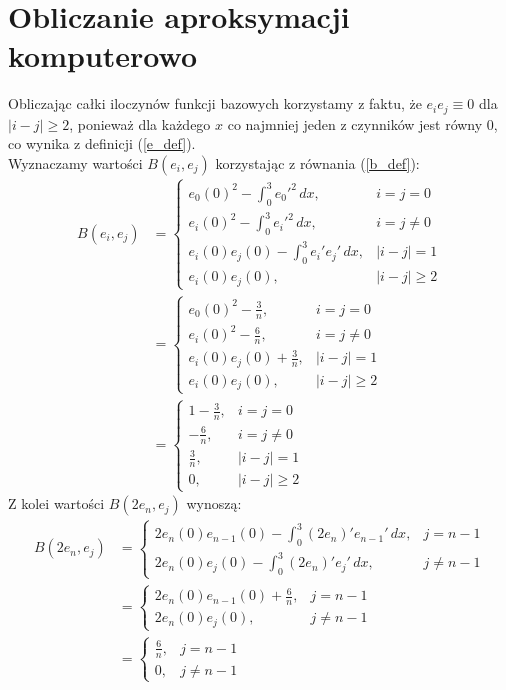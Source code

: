 \documentclass[a4paper,12pt]{article}
\begin{document}
    \section{Obliczanie aproksymacji komputerowo}
    Obliczając całki iloczynów funkcji bazowych korzystamy z faktu, że \(e_i e_j \equiv 0\) dla \(|i-j| \geq 2\), ponieważ dla każdego \(x\) co najmniej jeden z czynników jest równy 0, co wynika z definicji (\ref{e_def}).\\
    Wyznaczamy wartości \(B(e_i, e_j)\) korzystając z równania (\ref{b_def}):
    \begin{align}
        B(e_i, e_j) &=
        \begin{cases}
            e_0(0)^2 - \int_{0}^{3} e_0'^2\,dx,& i = j = 0 \\
            e_i(0)^2 - \int_{0}^{3} e_i'^2\,dx,& i = j \neq 0 \\
            e_i(0)e_j(0) - \int_{0}^{3} e_i' e_j'\,dx,& |i-j| = 1 \\
            e_i(0)e_j(0),& |i-j| \geq 2
        \end{cases} \nonumber \\
        &=
        \begin{cases}
            e_0(0)^2 - \frac{3}{n},& i = j = 0 \\
            e_i(0)^2 - \frac{6}{n},& i = j \neq 0 \\
            e_i(0)e_j(0) + \frac{3}{n},& |i-j| = 1 \\
            e_i(0)e_j(0),& |i-j| \geq 2
        \end{cases} \nonumber \\
        &=
        \begin{cases}
            1-\frac{3}{n},& i = j = 0 \\
            -\frac{6}{n},& i = j \neq 0 \\
            \frac{3}{n},& |i-j| = 1 \\
            0,& |i-j| \geq 2
        \end{cases} \label{bij_val}
    \end{align}
    Z kolei wartości \(B(2e_n, e_j)\) wynoszą:
    \begin{align}
        B(2e_n, e_j) &=
        \begin{cases}
            2e_n(0)e_{n-1}(0) - \int_{0}^{3} (2e_n)' e_{n-1}'\,dx,& j = n-1 \\
            2e_n(0)e_j(0) - \int_{0}^{3} (2e_n)' e_j'\,dx,& j \neq n-1
        \end{cases} \nonumber \\
        &=
        \begin{cases}
            2e_n(0)e_{n-1}(0) + \frac{6}{n},& j = n-1 \\
            2e_n(0)e_j(0),& j \neq n-1
        \end{cases} \nonumber \\
        &=
        \begin{cases}
            \frac{6}{n},& j = n-1 \\
            0,& j \neq n-1
        \end{cases} \label{bnj_val}
    \end{align}
\end{document}
